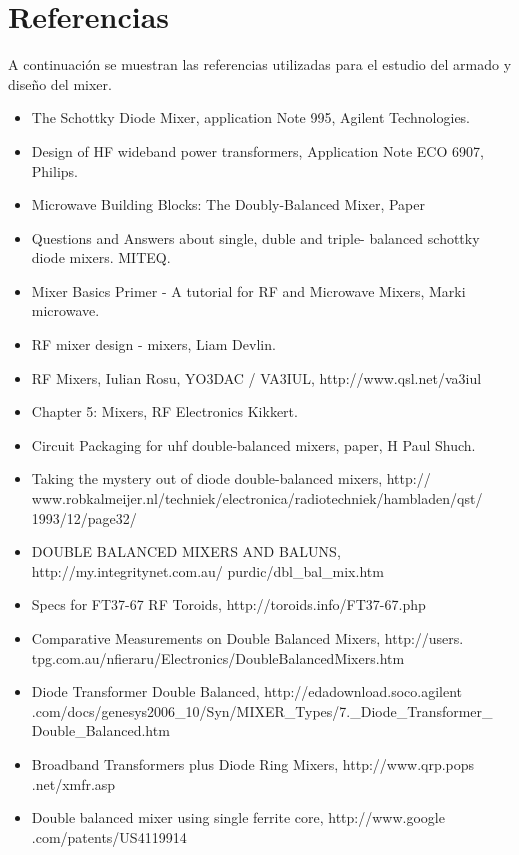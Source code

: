 \documentclass[a4paper,10pt]{article}
\begin{document}
	\section{Referencias}
	\indent A continuación se muestran las referencias utilizadas para el 
	estudio del armado y diseño del mixer.
	\begin{itemize}
		\item The Schottky Diode Mixer, application Note 995, Agilent 
		Technologies.
		\item Design of HF wideband power transformers, Application Note ECO 
		6907, Philips.
		\item Microwave Building Blocks: The Doubly-Balanced Mixer, Paper
		\item Questions and Answers about single, duble and triple- balanced 
		schottky diode mixers. MITEQ.
		\item Mixer Basics Primer - A tutorial for RF and Microwave Mixers, 
		Marki microwave.
		\item RF mixer design - mixers, Liam Devlin.
		\item RF Mixers, Iulian Rosu, YO3DAC / VA3IUL, http://www.qsl.net/va3iul
		\item Chapter 5: Mixers, RF Electronics Kikkert.
		\item Circuit Packaging for uhf double-balanced mixers, paper, H Paul 
		Shuch.
		\item Taking the mystery out of diode double-balanced mixers, http://
		www.robkalmeijer.nl/techniek/electronica/radiotechniek/hambladen/qst/
		1993/12/page32/
		\item DOUBLE BALANCED MIXERS AND BALUNS, http://my.integritynet.com.au/
		purdic/dbl\_bal\_mix.htm
		\item Specs for FT37-67 RF Toroids, http://toroids.info/FT37-67.php
		\item Comparative Measurements on Double Balanced Mixers, http://users.
		tpg.com.au/nfieraru/Electronics/DoubleBalancedMixers.htm
		\item Diode Transformer Double Balanced, http://edadownload.soco.agilent
		.com/docs/genesys2006\_10/Syn/MIXER\_Types/7.\_Diode\_Transformer\_
		Double\_Balanced.htm
		\item Broadband Transformers plus Diode Ring Mixers, http://www.qrp.pops
		.net/xmfr.asp
		\item Double balanced mixer using single ferrite core, http://www.google
		.com/patents/US4119914

	\end{itemize}
\end{document}
